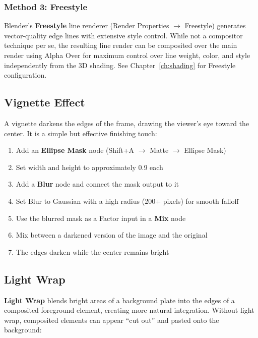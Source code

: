 \subsubsection{Method 3: Freestyle}

Blender's \textbf{Freestyle} line renderer (Render Properties $\rightarrow$ Freestyle) generates vector-quality edge lines with extensive style control. While not a compositor technique per se, the resulting line render can be composited over the main render using Alpha Over for maximum control over line weight, color, and style independently from the 3D shading. See Chapter~\ref{ch:shading} for Freestyle configuration.

\subsection{Vignette Effect}
\label{subsec:vignette}

A vignette darkens the edges of the frame, drawing the viewer's eye toward the center. It is a simple but effective finishing touch:

\begin{enumerate}[leftmargin=2em]
  \item Add an \textbf{Ellipse Mask} node (Shift+A $\rightarrow$ Matte $\rightarrow$ Ellipse Mask)
  \item Set width and height to approximately 0.9 each
  \item Add a \textbf{Blur} node and connect the mask output to it
  \item Set Blur to Gaussian with a high radius (200+ pixels) for smooth falloff
  \item Use the blurred mask as a Factor input in a \textbf{Mix} node
  \item Mix between a darkened version of the image and the original
  \item The edges darken while the center remains bright
\end{enumerate}

\subsection{Light Wrap}

\textbf{Light Wrap} blends bright areas of a background plate into the edges of a composited foreground element, creating more natural integration. Without light wrap, composited elements can appear ``cut out'' and pasted onto the background:

